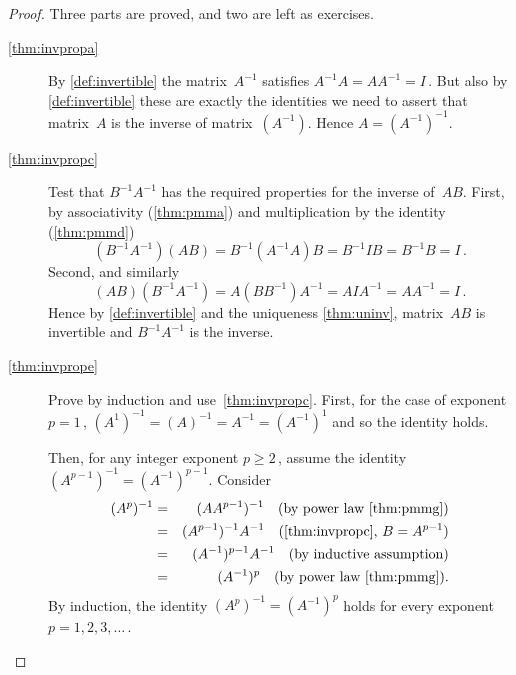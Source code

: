 \begin{proof} 
Three parts are proved, and two are left as exercises.
\begin{description}
\item[\ref{thm:invpropa}]
By \cref{def:invertible} the matrix~\(A^{-1}\) satisfies \(A^{-1}A=AA^{-1}=I\)\,.
But also by \cref{def:invertible} these are exactly the identities we need to assert that matrix~\(A\) is the inverse of matrix~\((A^{-1})\).
Hence \(A=(A^{-1})^{-1}\).

\item[\ref{thm:invpropc}]
Test that \(B^{-1}A^{-1}\) has the required properties for the inverse of~\(AB\).
First, by associativity (\cref{thm:pmma}) and multiplication by the identity (\cref{thm:pmmd})
\begin{equation*}
(B^{-1}A^{-1})(AB)
=B^{-1}(A^{-1}A)B
=B^{-1}IB
=B^{-1}B
=I\,.
\end{equation*}
Second, and similarly
\begin{equation*}
(AB)(B^{-1}A^{-1})
=A(BB^{-1})A^{-1}
=AIA^{-1}
=AA^{-1}
=I\,.
\end{equation*}
Hence by \cref{def:invertible} and the uniqueness \cref{thm:uninv}, matrix~\(AB\) is invertible and \(B^{-1}A^{-1}\) is the inverse.

\item[\ref{thm:invprope}]
Prove by induction and use~\cref{thm:invpropc}.
First, for the case of exponent \(p=1\)\,, \((A^1)^{-1}=(A)^{-1}=A^{-1}=(A^{-1})^1\) and so the identity holds.

Then, for any integer exponent \(p\geq2\)\,, assume the identity \((A^{p-1})^{-1}=(A^{-1})^{p-1}\).
Consider 
\begin{eqnarray*}
(A^p)^{-1}&=&(AA^{p-1})^{-1}\quad(\text{by power law \cref{thm:pmmg}})
\\&=&(A^{p-1})^{-1}A^{-1}\quad(\text{\cref{thm:invpropc}, }B=A^{p-1})
\\&=&(A^{-1})^{p-1}A^{-1}\quad(\text{by inductive assumption})
\\&=&(A^{-1})^p \quad(\text{by power law \cref{thm:pmmg}}).
\end{eqnarray*}
By induction, the identity \((A^{p})^{-1}=(A^{-1})^{p}\) holds for every exponent \(p=1,2,3,\ldots\)\,. 
\end{description}
\end{proof}




